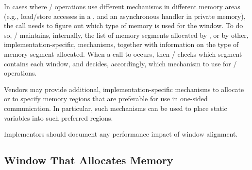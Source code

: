 \begin{implementors}
In cases where \RMA/ operations use different mechanisms in different
memory areas (e.g., load/store accesses in a , and an
asynchronous handler in private memory), the 
call needs to figure out which type of memory is used for the
window.  To do so, \MPI/ maintains, internally, the
list of memory segments allocated by , or by
other, implementation-specific,
mechanisms, together with information 
on the type of memory segment allocated.  When a call to 
 occurs, then \MPI/ checks which segment
contains each window, and decides, accordingly, which mechanism to use
for \RMA/ operations.

Vendors may provide additional, implementation-specific mechanisms to
allocate or to specify memory regions that are preferable for use in
one-sided communication. In particular, such mechanisms can be used to
place static variables into such preferred regions.

Implementors should document any performance impact of window alignment.
\end{implementors}

\subsection{Window That Allocates Memory}
\label{sec:winalloc}


